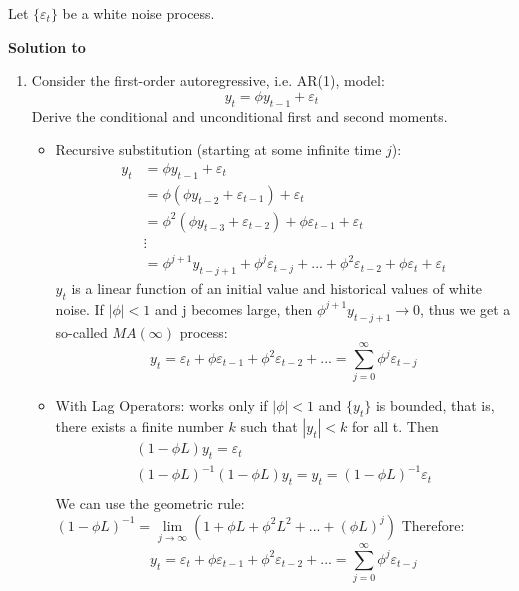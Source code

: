 Let $\{\varepsilon_t\}$ be a white noise process.

\begin{solution}\textbf{Solution to }
\end{solution}

\begin{enumerate}
    \item Consider the first-order autoregressive, i.e. AR(1), model:  $$y_t = \phi y_{t-1} + \varepsilon_{t}$$ Derive the conditional and unconditional first and second moments.
          \begin{solution}
              \begin{itemize}
                  \item Recursive substitution (starting at some infinite time $j$):
                        \begin{align*}
                            y_t & = \phi y_{t-1} + \varepsilon_t                                                                                      \\
                                & = \phi \left( \phi y_{t-2} + \varepsilon_{t-1}\right) + \varepsilon_t                                               \\
                                & = \phi^2(\phi y_{t-3} + \varepsilon_{t-2} ) + \phi \varepsilon_{t-1} + \varepsilon_t                                \\
                                & \vdots                                                                                                              \\
                                & = \phi^{j+1} y_{t-{j+1}}+\phi^j \varepsilon_{t-j}+...+\phi^2 \varepsilon_{t-2} + \phi \varepsilon_t + \varepsilon_t
                        \end{align*}
                        $y_t$ is a linear function of an initial value and historical values of white noise. If $|\phi|<1$ and j becomes large, then $ \phi^{j+1} y_{t-{j+1}} \rightarrow 0$, thus we get a so-called $MA(\infty)$ process:
                        $$y_t = \varepsilon_t + \phi \varepsilon_{t-1} + \phi^2 \varepsilon_{t-2}+... = \sum_{j=0}^\infty \phi^j \varepsilon_{t-j}$$
                  \item With Lag Operators: works only if $|\phi| < 1$ and $\{y_t\}$ is bounded, that is, there exists a finite number $k$ such that $|y_t| < k$ for all t. Then
                        \begin{align*}
                            (1-\phi L) y_t = \varepsilon_t                                    \\
                            (1-\phi L)^{-1}(1-\phi L) y_t =	y_t = (1-\phi L)^{-1}\varepsilon_t \\
                        \end{align*}
                        We can use the geometric rule: $(1-\phi L)^{-1} = \lim\limits_{j\rightarrow \infty}(1+\phi L + \phi^2 L^2+...+(\phi L)^j)$
                        Therefore:$$y_t = \varepsilon_t + \phi \varepsilon_{t-1} + \phi^2 \varepsilon_{t-2}+... = \sum_{j=0}^\infty \phi^j \varepsilon_{t-j}$$


\end{itemize}
\end{solution}
\end{enumerate}
